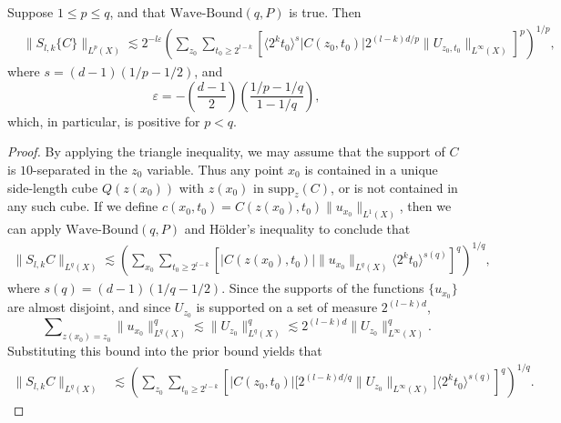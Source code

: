 \begin{lemma} \label{lemma:scaleupbound}
    Suppose $1 \leq p \leq q$, and that $\text{Wave-Bound}(q,P)$ is true. Then
    \begin{align*}
        &\| S_{l,k} \{ C \} \|_{L^p(X)}  \lesssim 2^{- l \varepsilon} \left( \sum\nolimits_{z_0} \sum\nolimits_{t_0 \geq 2^{l-k}} \left[ \langle 2^k t_0 \rangle^s |C(z_0,t_0)| 2^{(l-k)d/p} \| U_{z_0,t_0} \|_{L^\infty(X)} \right]^p \right)^{1/p},
    \end{align*}
    where $s = (d-1)(1/p - 1/2)$, and
    \[ \varepsilon = - \left( \frac{d-1}{2} \right) \left( \frac{1/p - 1/q}{1 - 1/q} \right), \]
    which, in particular, is positive for $p < q$.
\end{lemma}
\begin{proof}
    By applying the triangle inequality, we may assume that the support of $C$ is $10$-separated in the $z_0$ variable. Thus any point $x_0$ is contained in a unique side-length cube $Q(z(x_0))$ with $z(x_0)$ in $\text{supp}_z(C)$, or is not contained in any such cube. If we define $c(x_0,t_0) = C(z(x_0),t_0) \| u_{x_0} \|_{L^1(X)}$, then we can apply $\text{Wave-Bound}(q,P)$ and H\"{o}lder's inequality to conclude that
    \begin{equation}
    \begin{split}
      \| S_{l,k} C \|_{L^q(X)} \lesssim \left( \sum\nolimits_{x_0} \sum\nolimits_{t_0 \geq 2^{l-k}} \left[ |C(z(x_0),t_0)| \| u_{x_0} \|_{L^q(X)} \langle 2^k t_0 \rangle^{s(q)} \right]^q \right)^{1/q},
    \end{split}
    \end{equation}
    where $s(q) = (d-1)(1/q - 1/2)$. Since the supports of the functions $\{ u_{x_0} \}$ are almost disjoint, and since $U_{z_0}$ is supported on a set of measure $2^{(l-k)d}$,
    \begin{equation}
        \sum\nolimits_{z(x_0) = z_0} \| u_{x_0} \|_{L^q(X)}^q \lesssim \| U_{z_0} \|_{L^q(X)}^q \lesssim 2^{(l-k)d} \| U_{z_0} \|_{L^\infty(X)}^q.
    \end{equation}
    Substituting this bound into the prior bound yields that
    \begin{equation}
    \begin{split}
        \| S_{l,k} C \|_{L^q(X)} &\lesssim \left( \sum\nolimits_{z_0} \sum\nolimits_{t_0 \geq 2^{l-k}} \left[ |C(z_0,t_0)| \big[ 2^{(l-k)d/q} \| U_{z_0} \|_{L^\infty(X)} \big] \langle 2^k t_0 \rangle^{s(q)} \right]^q \right)^{1/q}.

\end{split}
\end{equation}
\end{proof}
